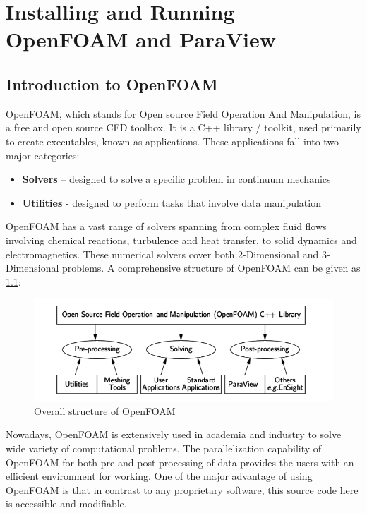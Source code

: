 \documentclass[a4paper,12pt]{report}
\begin{document}
\chapter{Installing and Running OpenFOAM and ParaView}
\section{Introduction to OpenFOAM}
\flushleft OpenFOAM, which stands for Open source
 Field Operation And Manipulation, is a free and open source CFD toolbox. It is a C++ library / toolkit,
used primarily to create executables, known as applications. These applications fall into
 two major categories:
 \begin{itemize}
   \item \textbf{Solvers} – designed to solve a specific problem in continuum mechanics
   \item \textbf{Utilities} - designed to perform tasks that involve data manipulation
 \end{itemize}
 \flushleft OpenFOAM has a vast range of solvers spanning from complex fluid flows involving chemical reactions, turbulence and heat transfer, to solid dynamics and electromagnetics. These numerical solvers cover both 2-Dimensional and 3-Dimensional problems. A comprehensive structure of OpenFOAM can be given as \ref{1}:
 
\begin{figure}[ht]  
\begin{center}  
\includegraphics[scale=0.5]{1.png}
\caption{Overall structure of OpenFOAM}
\label{1}
\end{center}  
\end{figure}

\flushleft Nowadays, OpenFOAM is extensively used in academia
 and industry to solve wide variety of computational problems. The parallelization capability of OpenFOAM for both pre and post-processing of data provides the users with an efficient environment for working.  One of the major advantage of using OpenFOAM is that in contrast to any proprietary software, this source code here is accessible and modifiable.
\end{document}
